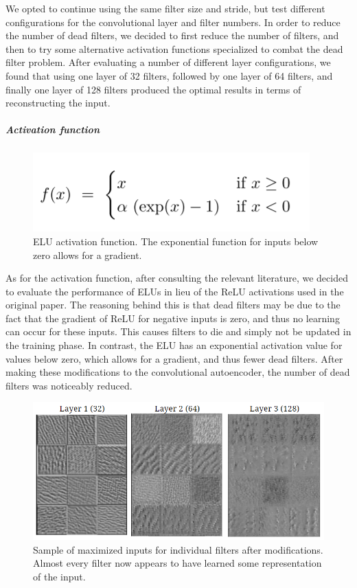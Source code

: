 \documentclass{article}
\begin{document}
We opted to continue using the same filter size and stride, but test different configurations for the convolutional layer and filter numbers. In order to reduce the number of dead filters, we decided to first reduce the number of filters, and then to try some alternative activation functions specialized to combat the dead filter problem. After evaluating a number of different layer configurations, we found that using one layer of 32 filters, followed by one layer of 64 filters, and finally one layer of 128 filters produced the optimal results in terms of reconstructing the input. 
\subparagraph{Activation function}
\begin{figure}[!ht]
    \centering
    \includegraphics[scale=0.75]{elu}
    \caption{ELU activation function. The exponential function for inputs below zero allows for a gradient.}
\end{figure}
As for the activation function, after consulting the relevant literature, we decided to evaluate the performance of ELUs in lieu of the ReLU activations used in the original paper. The reasoning behind this is that dead filters may be due to the fact that the gradient of ReLU for negative inputs is zero, and thus no learning can occur for these inputs. This causes filters to die and simply not be updated in the training phase. In contrast, the ELU has an exponential activation value for values below zero, which allows for a gradient, and thus fewer dead filters. After making these modifications to the convolutional autoencoder, the number of dead filters was noticeably reduced.
\begin{figure}
    \centering
    \includegraphics{inputs_optimized}
    \caption{Sample of maximized inputs for individual filters after modifications. Almost every filter now appears to have learned some representation of the input.}\label{fig:inputs_optimized}
\end{figure}
\end{document}
